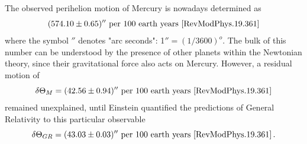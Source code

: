 \documentclass[12pt,ngerman,american]{iopart}
\begin{document}
The observed perihelion motion of Mercury is nowadays determined as
\[(574.10\pm 0.65)'' \ \mbox{per 100 earth years \cite{RevModPhys.19.361}}\]
where the symbol $''$ denotes "arc seconds": 1$''={(1/3600)}^o$. The bulk of this number
can be understood by the presence of other planets within the Newtonian theory, since
their gravitational force also acts on Mercury. However, a
residual motion of
\begin{equation}
\delta \Theta_M = (42.56\pm 0.94)'' \ \mbox{per 100 earth years \cite{RevModPhys.19.361}} \label{delT}
\end{equation}
remained unexplained, until Einstein quantified the predictions of General Relativity to this particular observable \cite{Einstein}
\begin{equation}
\delta \Theta_{GR} = (43.03\pm 0.03)'' \ \mbox{per 100 earth years \cite{RevModPhys.19.361}} \label{delT} \, .
\end{equation}
\end{document}
